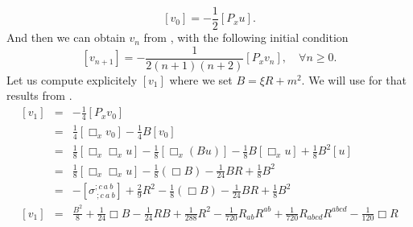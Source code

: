 \documentclass[10pt]{book}
\theoremstyle{break}
\begin{document}
%
\begin{equation*}
\left[v_0\right] = - \frac12 \left[P_x u\right] .
\end{equation*}
%
And then we can obtain $v_n$ from %
, with the following initial condition%
%
\begin{equation*}
\left[v_{n+1}\right] = - \frac{1}{2\left(n+1\right)\left(n+2\right)} \left[P_x v_n\right] , \quad \forall n \geq 0.
\end{equation*}
%
Let us compute explicitely $\left[v_1\right]$ where we set $B=\xi R +m^2$. We will use for that results from \cite{christensen_vacuum_1976}.
%
\begin{eqnarray*}
\left[v_1\right] 
&=& - \frac{1}{4} \left[P_x v_0\right] \\
&=& \frac14 \left[\Box_x v_0 \right] - \frac14 B \left[v_0\right] \\
&=& \frac18 \left[\Box_x \Box_x u \right] - \frac18 \left[ \Box_x \left( B u \right)\right] - \frac18 B \left[ \Box_x u \right] + \frac18 B^2 \left[ u \right] \\
&=& \frac18 \left[\Box_x \Box_x u \right] - \frac18 \left(\Box B\right) - \frac{1}{24} B R + \frac18 B^2 \\
&=& - \left[\sigma^{;c \ a \ b}_{\ ; c \ a \ b} \right] 
+ \frac29 R^2 
- \frac18 \left(\Box B\right) - \frac{1}{24} B R + \frac18 B^2 \\
\left[v_1\right] &=& \frac{B^2}{8} + \frac{1}{24} \Box B - \frac{1}{24} RB + \frac{1}{288} R^2 - \frac{1}{720} R_{ab} R^{ab} + \frac{1}{720} R_{abcd} R^{abcd} - \frac{1}{120} \Box R
\end{eqnarray*}
\end{document}
